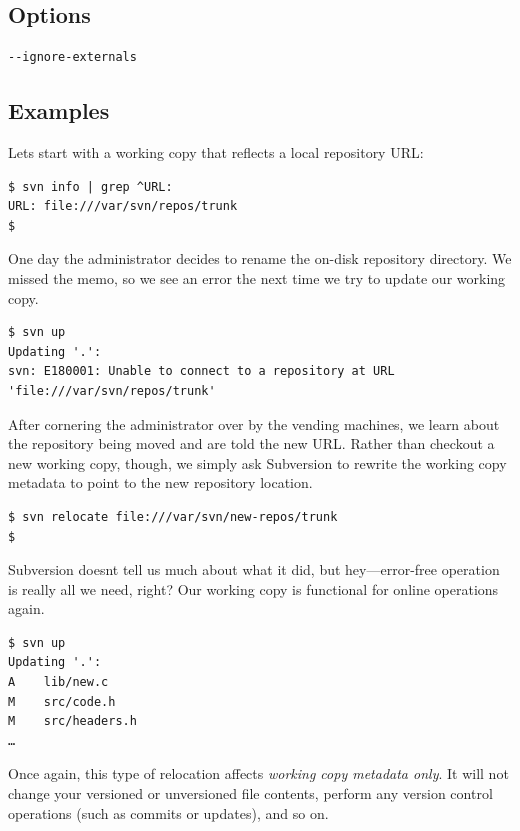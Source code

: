 \subsection{Options}

\begin{verbatim}
--ignore-externals
\end{verbatim}

\subsection{Examples}

Let\textquotesingle s start with a working copy that reflects a local
repository URL:

\begin{verbatim}
$ svn info | grep ^URL:
URL: file:///var/svn/repos/trunk
$
\end{verbatim}

One day the administrator decides to rename the on-disk repository
directory. We missed the memo, so we see an error the next time we try
to update our working copy.

\begin{verbatim}
$ svn up
Updating '.':
svn: E180001: Unable to connect to a repository at URL 'file:///var/svn/repos/trunk'
\end{verbatim}

After cornering the administrator over by the vending machines, we learn
about the repository being moved and are told the new URL. Rather than
checkout a new working copy, though, we simply ask Subversion to rewrite
the working copy metadata to point to the new repository location.

\begin{verbatim}
$ svn relocate file:///var/svn/new-repos/trunk
$
\end{verbatim}

Subversion doesn\textquotesingle t tell us much about what it did, but
hey---error-free operation is really all we need, right? Our working
copy is functional for online operations again.

\begin{verbatim}
$ svn up
Updating '.':
A    lib/new.c
M    src/code.h
M    src/headers.h
…
\end{verbatim}

Once again, this type of relocation affects \emph{working copy metadata
only}. It will not change your versioned or unversioned file contents,
perform any version control operations (such as commits or updates), and
so on.

